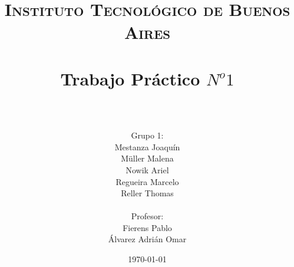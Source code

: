 



\title{
	\normalfont \normalsize \textsc{Instituto Tecnológico de Buenos Aires} \\ [25pt]
	\horrule{2pt} \\[0.4cm]
	\huge Trabajo Pr\'actico $N^o 1$ \\
	\horrule{2pt} \\[0cm]
\author{Grupo 1:\\Mestanza Joaqu\'in \\  Müller Malena  \\ Nowik Ariel  \\ Regueira Marcelo  \\   Reller Thomas \\ \\  Profesor: \\Fierens Pablo\\ \'Alvarez Adri\'an Omar \\}
}
\date{\today} %

\maketitle
\newpage


%

%


%

